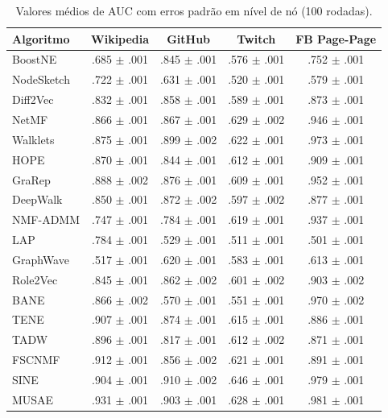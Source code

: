 \documentclass[sigconf]{acmart}
\begin{document}
\begin{table}[h]
\centering
\caption{Valores médios de AUC com erros padrão em nível de nó (100 rodadas).}
\label{tab:auc_node}
\small
\begin{tabular}{lcccc}
\toprule
Algoritmo & Wikipedia & GitHub & Twitch & FB Page-Page \\
\midrule
BoostNE & .685 $\pm$ .001 & .845 $\pm$ .001 & .576 $\pm$ .001 & .752 $\pm$ .001 \\
NodeSketch & .722 $\pm$ .001 & .631 $\pm$ .001 & .520 $\pm$ .001 & .579 $\pm$ .001 \\
Diff2Vec & .832 $\pm$ .001 & .858 $\pm$ .001 & .589 $\pm$ .001 & .873 $\pm$ .001 \\
NetMF & .866 $\pm$ .001 & .867 $\pm$ .001 & .629 $\pm$ .002 & .946 $\pm$ .001 \\
Walklets & .875 $\pm$ .001 & .899 $\pm$ .002 & .622 $\pm$ .001 & .973 $\pm$ .001 \\
HOPE & .870 $\pm$ .001 & .844 $\pm$ .001 & .612 $\pm$ .001 & .909 $\pm$ .001 \\
GraRep & .888 $\pm$ .002 & .876 $\pm$ .001 & .609 $\pm$ .001 & .952 $\pm$ .001 \\
DeepWalk & .850 $\pm$ .001 & .872 $\pm$ .002 & .597 $\pm$ .002 & .877 $\pm$ .001 \\
NMF-ADMM & .747 $\pm$ .001 & .784 $\pm$ .001 & .619 $\pm$ .001 & .937 $\pm$ .001 \\
LAP & .784 $\pm$ .001 & .529 $\pm$ .001 & .511 $\pm$ .001 & .501 $\pm$ .001 \\
GraphWave & .517 $\pm$ .001 & .620 $\pm$ .001 & .583 $\pm$ .001 & .613 $\pm$ .001 \\
Role2Vec & .845 $\pm$ .001 & .862 $\pm$ .002 & .601 $\pm$ .002 & .903 $\pm$ .002 \\
BANE & .866 $\pm$ .002 & .570 $\pm$ .001 & .551 $\pm$ .001 & .970 $\pm$ .002 \\
TENE & .907 $\pm$ .001 & .874 $\pm$ .001 & .615 $\pm$ .001 & .886 $\pm$ .001 \\
TADW & .896 $\pm$ .001 & .817 $\pm$ .001 & .612 $\pm$ .002 & .871 $\pm$ .001 \\
FSCNMF & .912 $\pm$ .001 & .856 $\pm$ .002 & .621 $\pm$ .001 & .891 $\pm$ .001 \\
SINE & .904 $\pm$ .001 & .910 $\pm$ .002 & .646 $\pm$ .001 & .979 $\pm$ .001 \\
MUSAE & .931 $\pm$ .001 & .903 $\pm$ .001 & .628 $\pm$ .001 & .981 $\pm$ .001 \\
\bottomrule
\end{tabular}
\end{table}
\end{document}
